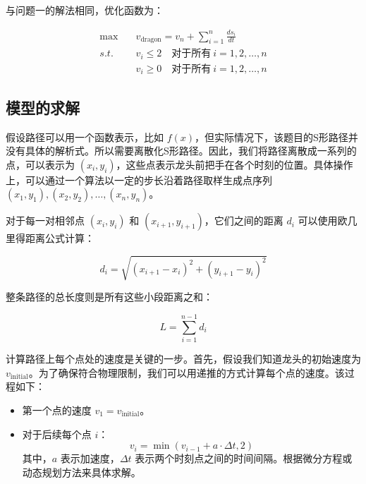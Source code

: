 \documentclass[withoutpreface, bwprint]{cumcmthesis} %
\begin{document}
与问题一的解法相同，优化函数为：

\begin{equation}
    \begin{aligned}
        \text{max} \quad & v_{\text{dragon}} = v_n + \sum_{i=1}^{n} \frac{ds_i}{dt} \\
        s.t. \quad       & v_{i} \leq 2 \quad \text{对于所有} \ i = 1, 2, \ldots, n     \\
                         & v_{i} \geq 0 \quad \text{对于所有} \ i = 1, 2, \ldots, n
    \end{aligned}
\end{equation}

\subsection{模型的求解}

假设路径可以用一个函数表示，比如 $f(x)$，但实际情况下，该题目的S形路径并没有具体的解析式。所以需要离散化S形路径。因此，我们将路径离散成一系列的点，可以表示为 $(x_i, y_i)$，这些点表示龙头前把手在各个时刻的位置。具体操作上，可以通过一个算法以一定的步长沿着路径取样生成点序列 $(x_1, y_1), (x_2, y_2), \ldots, (x_n, y_n)$。

对于每一对相邻点 $(x_i, y_i)$ 和 $(x_{i+1}, y_{i+1})$，它们之间的距离 $d_i$ 可以使用欧几里得距离公式计算：

\begin{equation}
    d_i = \sqrt{(x_{i+1} - x_i)^2 + (y_{i+1} - y_i)^2}
\end{equation}

整条路径的总长度则是所有这些小段距离之和：

\begin{equation}
    L = \sum_{i=1}^{n-1} d_i
\end{equation}

计算路径上每个点处的速度是关键的一步。首先，假设我们知道龙头的初始速度为 $v_{\text{initial}}$。为了确保符合物理限制，我们可以用递推的方式计算每个点的速度。该过程如下：

\begin{itemize}
    \item 第一个点的速度 $v_1 = v_{\text{initial}}$。
    \item 对于后续每个点 $i$：
          \begin{equation}
              v_i = \min(v_{i-1} + a \cdot \Delta t, 2)
          \end{equation}
          其中，$a$ 表示加速度，$\Delta t$ 表示两个时刻点之间的时间间隔。根据微分方程或动态规划方法来具体求解。
\end{itemize}
\end{document}
